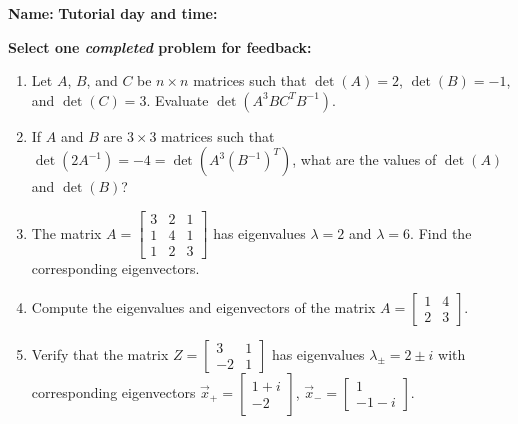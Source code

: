 \documentclass[12pt]{article}
\newcommand{\bbm}{\begin{bmatrix}}
\newcommand{\ebm}{\end{bmatrix}}
\begin{document}
{\bf \large Name:} \hspace{2.5in} {\bf Tutorial day and time:}

\bigskip

{\bf Select {\bf one} {\em completed} problem for feedback:}

\bigskip


\thispagestyle{fancy}
 \begin{enumerate}
\item Let $A$, $B$, and $C$ be $n\times n$ matrices such that $\det(A) = 2$, $\det(B)=-1$, and $\det(C) = 3$. Evaluate $\det(A^3BC^TB^{-1})$.

\vspace{1in}

\item If $A$ and $B$ are $3\times 3$ matrices such that $\det(2A^{-1}) = -4 = \det(A^3(B^{-1})^T)$, what are the values of $\det(A)$ and $\det(B)$?

\vspace{1in}

\item The matrix $A = \bbm 3&2&1\\1&4&1\\1&2&3\ebm$ has eigenvalues $\lambda=2$ and $\lambda=6$. Find the corresponding eigenvectors.

\newpage

\item Compute the eigenvalues and eigenvectors of the matrix $A = \bbm 1&4\\2&3\ebm$.

\vspace{5in}

\item Verify that the matrix $Z = \bbm 3&1\\-2&1\ebm$ has eigenvalues $\lambda_\pm = 2\pm i$ with corresponding eigenvectors $\vec{x}_+ = \bbm 1+i\\-2\ebm$, $\vec{x}_- = \bbm 1\\-1-i\ebm$.

 \end{enumerate}
\end{document}
